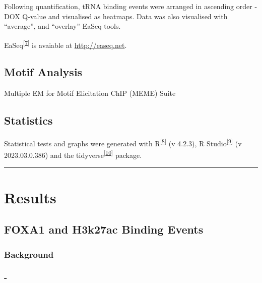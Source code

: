 \documentclass[
  12pt,
]{article}
\begin{document}
Following quantification, tRNA binding events were arranged in ascending order -DOX Q-value and visualised as heatmaps.
Data was also visualised with ``average'', and ``overlay'' EaSeq tools.

EaSeq\textsuperscript{{[}\protect\hyperlink{ref-lerdrup2016}{7}{]}} is avaiable at \url{http://easeq.net}.

\hypertarget{motif-analysis}{%
\subsection{Motif Analysis}\label{motif-analysis}}

Multiple EM for Motif Elicitation ChIP (MEME) Suite

\hypertarget{statistics}{%
\subsection{Statistics}\label{statistics}}

Statistical tests and graphs were generated with R\textsuperscript{{[}\protect\hyperlink{ref-r}{8}{]}} (v 4.2.3), R Studio\textsuperscript{{[}\protect\hyperlink{ref-rstudio}{9}{]}} (v 2023.03.0.386) and the tidyverse\textsuperscript{{[}\protect\hyperlink{ref-wickham2019}{10}{]}} package.

\begin{center}\rule{0.5\linewidth}{0.5pt}\end{center}

\hypertarget{results}{%
\section{Results}\label{results}}

\hypertarget{foxa1-and-h3k27ac-binding-events}{%
\subsection{FOXA1 and H3k27ac Binding Events}\label{foxa1-and-h3k27ac-binding-events}}

\hypertarget{background}{%
\subsubsection{Background}\label{background}}

\hypertarget{section}{%
\subsubsection{-}\label{section}}
\end{document}
